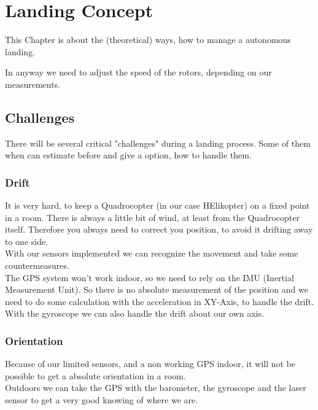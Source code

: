 
\chapter{Landing Concept}
\label{cha:LandingCon}


This Chapter is about the (theoretical) ways, how to manage a autonomous landing.

In anyway we need to adjust the speed of the rotors, depending on our measurements.


\section{Challenges}
\label{sec:landcha}

There will be several critical "challenges" during a landing process. Some of them when can estimate before and give a option, how to handle them.


\subsection{Drift}

It is very hard, to keep a Quadrocopter (in our case HElikopter) on a fixed point in a room. There is always a little bit of wind, at least from the Quadrocopter itself. Therefore you always need to correct you position, to avoid it drifting away to one side.\\
With our sensors implemented we can recognize the movement and take some countermeasures.\\

The GPS system won't work indoor, so we need to rely on the IMU (Inertial Measurement Unit). So there is no absolute measurement of the position and we need to do some calculation with the acceleration in XY-Axis, to handle the drift.\\

With the gyroscope we can also handle the drift about our own axis.


\subsection{Orientation}

Because of our limited sensors, and a non working GPS indoor, it will not be possible to get a absolute orientation in a room.\\

Outdoors we can take the GPS with the barometer, the gyroscope and the laser sensor to get a very good knowing of where we are.


